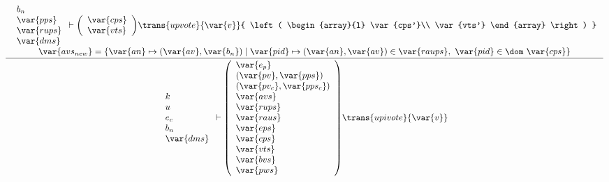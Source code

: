 \begin{figure}[htb]
  \begin{equation}
    \label{eq:rule:upi-vote}
    \inference
    {
      {
        \begin{array}{l}
          b_n\\
          \var{pps}\\
          \var{rups}\\
          \var{dms}
        \end{array}
      }
      \vdash
      {
        \left(
          \begin{array}{l}
            \var{cps}\\
            \var{vts}
          \end{array}
        \right)
      }
      \trans{upvote}{\var{v}}
      {
        \left(
          \begin{array}{l}
            \var{cps'}\\
            \var{vts'}
          \end{array}
        \right)
      }\\
      \var{avs_{new}} = \{ \var{an} \mapsto (\var{av}, \var{b_n})
      \mid \var{pid} \mapsto (\var{an}, \var{av}) \in \var{raups}
      ,~ \var{pid} \in \dom~\var{cps}
      \}
    }
    {
      {
        \begin{array}{l}
          k\\
          u\\
          e_c\\
          b_n\\
          \var{dms}
        \end{array}
      }
      \vdash
      {
        \left(
          \begin{array}{l}
            \var{e_p}\\
            (\var{pv}, \var{pps})\\
            (\var{pv_c}, \var{pps_c})\\
            \var{avs}\\
            \var{rups}\\
            \var{raus}\\
            \var{eps}\\
            \var{cps}\\
            \var{vts}\\
            \var{bvs}\\
            \var{pws}
          \end{array}
        \right)
      }
      \trans{upivote}{\var{v}}
}
\end{equation}
\end{figure}
